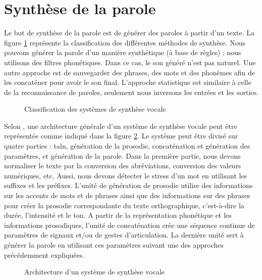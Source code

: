 \documentclass{KodeBook}
\begin{document}
\section{Synthèse de la parole}

Le but de synthèse de la parole est de générer des paroles à partir d'un texte. 
La figure \ref{fig:tts-classif} représente la classification des différentes méthodes de synthèse. 
Nous pouvons générer la parole d'un manière synthétique (à base de règles) ; nous utilisons des filtres phonétiques. 
Dans ce cas, le son généré n'est pas naturel. 
Une autre approche est de sauvegarder des phrases, des mots et des phonèmes afin de les concaténer pour avoir le son final. 
L'approche statistique est similaire à celle de la reconnaissance de paroles, seulement nous inversons les entrées et les sorties. 

\begin{figure}[!ht]
	\centering
	\caption{Classification des systèmes de synthèse vocale}
	\label{fig:tts-classif}
\end{figure}

Selon \citet{2017-Hinterleitner}, une architecture générale d'un système de synthèse vocale peut être représentée comme indiqué dans la figure \ref{fig:tts-arch}. 
Le système peut être divisé sur quatre parties : \ac{taln}, génération de la prosodie, concaténation et génération des paramètres, et génération de la parole. 
Dans la première partie, nous devons  normaliser le texte par la conversion des abréviations, conversion des valeurs numériques, etc. 
Aussi, nous devons détecter le stress d'un mot en utilisant les suffixes et les préfixes. 
L'unité de génération de prosodie utilise des informations sur les accents de mots et de phrases ainsi que des informations sur des phrases pour créer la prosodie correspondante du texte orthographique, c'est-à-dire la durée, l'intensité et le ton.
A partir de la représentation phonétique et les informations prosodiques, l'unité de concaténation crée une séquence continue de paramètres de signaux et/ou de gestes d'articulation.
La dernière unité sert à générer la parole en utilisant ces paramètres suivant une des approches précédemment expliquées.

\begin{figure}[!ht]
	\centering
	\caption[Architecture d'un système de synthèse vocale]{Architecture d'un système de synthèse vocale \cite{2017-Hinterleitner}}
	\label{fig:tts-arch}
\end{figure}
\end{document}
